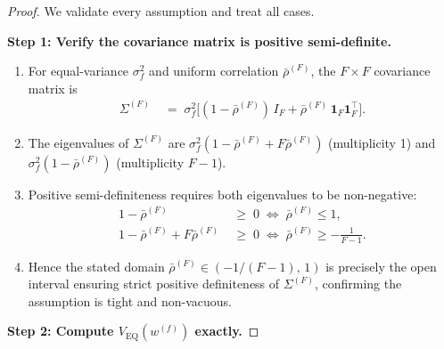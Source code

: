 \documentclass[12pt,openany]{book}
\newcommand{\bfw}{\mathbf{w}}
\newcommand{\bfone}{\mathbf{1}}
\numberwithin{equation}{chapter}
\theoremstyle{plain}
\theoremstyle{definition}
\theoremstyle{remark}
\def\bfw{w}%
\begin{document}
\begin{proof}
We validate every assumption and treat all cases.

\medskip
\noindent\textbf{Step 1: Verify the covariance matrix is
positive semi-definite.}

\begin{enumerate}
  \item For equal-variance $\sigma_f^2$ and uniform correlation
        $\bar{\rho}^{(F)}$, the $F \times F$ covariance matrix is
        \begin{align}
          \Sigma^{(F)}
          &\;=\; \sigma_f^2
                 \bigl[(1 - \bar{\rho}^{(F)})\,I_F
                        + \bar{\rho}^{(F)}\,\bfone_F\bfone_F^\top\bigr].
        \end{align}
  \item The eigenvalues of $\Sigma^{(F)}$ are
        $\sigma_f^2(1 - \bar{\rho}^{(F)} + F\bar{\rho}^{(F)})$
        (multiplicity 1) and
        $\sigma_f^2(1 - \bar{\rho}^{(F)})$ (multiplicity $F-1$).
  \item Positive semi-definiteness requires both eigenvalues to be
        non-negative:
        \begin{align}
          1 - \bar{\rho}^{(F)} &\;\geq\; 0
          \;\Longleftrightarrow\;
          \bar{\rho}^{(F)} \leq 1,
          \\
          1 - \bar{\rho}^{(F)} + F\bar{\rho}^{(F)} &\;\geq\; 0
          \;\Longleftrightarrow\;
          \bar{\rho}^{(F)} \geq -\tfrac{1}{F-1}.
        \end{align}
  \item Hence the stated domain $\bar{\rho}^{(F)} \in
        (-1/(F-1),\,1)$ is precisely the open interval ensuring
        strict positive definiteness of $\Sigma^{(F)}$, confirming
        the assumption is tight and non-vacuous.
\end{enumerate}

\medskip
\noindent\textbf{Step 2: Compute
$V_{\mathrm{EQ}}(\bfw^{(f)})$ exactly.}


\end{proof}
\end{document}
